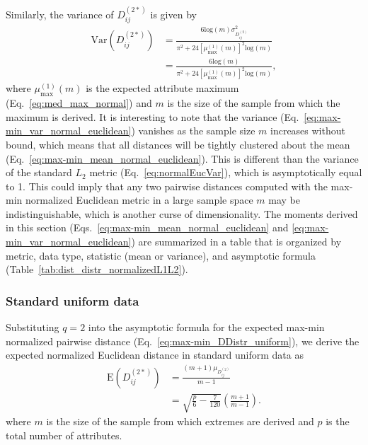 \documentclass[aos]{imsart}
\begin{document}
Similarly, the variance of $D^{(2*)}_{ij}$ is given by
%
\begin{equation}\label{eq:max-min_var_normal_euclidean}
\begin{aligned}
\text{Var}\left(D^{(2*)}_{ij}\right) &= \frac{6\text{log}(m)\sigma^2_{D^{(2)}_{ij}}}{\pi^2 + 24\left[\mu^{(1)}_\text{max}(m)\right]^2\text{log}(m)} \\
&= \frac{6\text{log}(m)}{\pi^2 + 24\left[\mu^{(1)}_\text{max}(m)\right]^2\text{log}(m)},
\end{aligned}
\end{equation}
%
where $\mu^{(1)}_\text{max}(m)$ is the expected attribute maximum (Eq.~\ref{eq:med_max_normal}) and $m$ is the size of the sample from which the maximum is derived. It is interesting to note that the variance (Eq.~\ref{eq:max-min_var_normal_euclidean}) vanishes as the sample size $m$ increases without bound, which means that all distances will be tightly clustered about the mean (Eq.~\ref{eq:max-min_mean_normal_euclidean}). This is different than the variance of the standard $L_2$ metric (Eq.~\ref{eq:normalEucVar}), which is asymptotically equal to 1. This could imply that any two pairwise distances computed with the max-min normalized Euclidean metric in a large sample space $m$ may be indistinguishable, which is another curse of dimensionality. The moments derived in this section (Eqs.~\ref{eq:max-min_mean_normal_euclidean} and \ref{eq:max-min_var_normal_euclidean}) are summarized in a table that is organized by metric, data type, statistic (mean or variance), and asymptotic formula (Table~\ref{tab:dist_distr_normalizedL1L2}).

\subsubsection{Standard uniform data}

Substituting $q=2$ into the asymptotic formula for the expected max-min normalized pairwise distance (Eq.~\ref{eq:max-min_DDistr_uniform}), we derive the expected normalized Euclidean distance in standard uniform data as
%
\begin{equation}\label{eq:max-min_mean_uniform_euclidean}
\begin{aligned}
\text{E}\left(D^{(2*)}_{ij}\right) &= \frac{(m+1)\mu_{D^{(2)}_{ij}}}{m-1} \\
&= \sqrt{\frac{p}{6} - \frac{7}{120}}\left(\frac{m+1}{m-1}\right).
\end{aligned}
\end{equation}
%
where $m$ is the size of the sample from which extremes are derived and $p$ is the total number of attributes.
\end{document}
